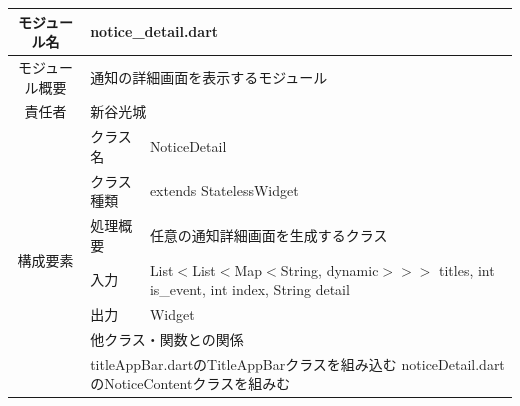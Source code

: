 \begin{table}[H]
  \centering
  \begin{tabular}{|c|l|l|} \hline
    モジュール名                & \multicolumn{2}{l|}{notice\_detail.dart}                                                                                                                               \\ \hline
    モジュール概要               & \multicolumn{2}{p{12cm}|}{通知の詳細画面を表示するモジュール}                                                                                                                           \\ \hline
    責任者                   & \multicolumn{2}{l|}{新谷光城}                                                                                                                                              \\ \hline
    \multirow{7}{*}{構成要素} & クラス名                                         & NoticeDetail                                                                                                            \\ \cline{2-3}
                          & クラス種類                                        & extends StatelessWidget                                                                                                 \\ \cline{2-3}
                          & 処理概要                                         & \multicolumn{1}{p{12cm}|}{任意の通知詳細画面を生成するクラス}                                                                            \\ \cline{2-3}
                          & 入力                                           & \multicolumn{1}{p{12cm}|}{List$<$List$<$Map$<$String, dynamic$>$$>$$>$ titles, int is\_event, int index, String detail} \\ \cline{2-3}
                          & 出力                                           & Widget                                                                                                                  \\ \cline{2-3}
                          & \multicolumn{2}{l|}{他クラス・関数との関係}                                                                                                                                       \\ \cline{2-3}
                          & \multicolumn{2}{p{14cm}|}{
      titleAppBar.dartのTitleAppBarクラスを組み込む
      \newline noticeDetail.dartのNoticeContentクラスを組みむ
}
\end{tabular}
\end{table}
